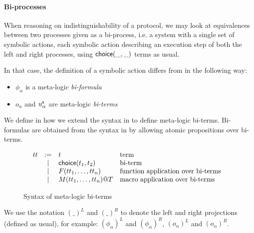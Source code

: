 \paragraph{Bi-processes}

When reasoning on indistinguishability of a protocol, we may look at equivalences
between two processes given as a bi-process, i.e. a system with a single set of
symbolic actions, each symbolic action describing an execution step of both the
left and right processes, using $\mathsf{choice}(\_,\_)$ terms as usual.

In that case, the definition of a symbolic action differs from 
in the following way:
\begin{itemize}
  \item $\phi_{\alpha}$ is a meta-logic \emph{bi-formula}
  \item $o_{\alpha}$ and $u_{\alpha}^{\textsf{s}}$ are meta-logic \emph{bi-terms}
\end{itemize}

We define in  how we extend the syntax in 
to define meta-logic bi-terms.
Bi-formulas are obtained from the syntax in  by allowing
atomic propositions over bi-terms.

\begin{figure}[h]
  \[
  \begin{array}{rcll}
    tt & := & t &\text{term} \\
    & \mid & \mathsf{choice}(t_1,t_2) &\text{bi-term}\\
    & \mid & F(tt_1,\dots,tt_n) &\text{function application over bi-terms}\\
    & \mid & M(tt_1,\ldots,tt_n)@T &\text{macro application over bi-terms}\\
  \end{array}
  \]
  \caption{Syntax of meta-logic bi-terms}\label{fig:bi-terms}
\end{figure}

We use the notation $(\_)^L$ and $(\_)^R$ to denote the left and right projections
(defined as usual), for example: $(\phi_{\alpha})^L$ and $(\phi_{\alpha})^R$,
$(o_{\alpha})^L$ and $(o_{\alpha})^R$.


